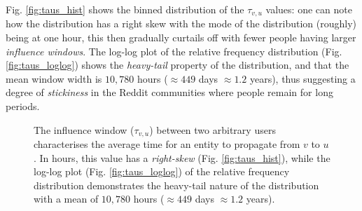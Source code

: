 \documentclass[review]{elsarticle}
\begin{document}
Fig. \ref{fig:taus_hist} shows the binned distribution of the $\tau_{v,u}$ values: one can note how the distribution has a right skew with the mode of the distribution (roughly) being at one hour, this then gradually curtails off with fewer people having larger \emph{influence windows}.
The log-log plot of the relative frequency distribution (Fig. \ref{fig:taus_loglog}) shows the \emph{heavy-tail} property of the distribution, and that the mean window width is $10,780$ hours ($\approx 449$ days $\approx 1.2$ years), thus suggesting a degree of \emph{stickiness} in the Reddit communities where people remain for long periods.


\begin{figure}[ht!]
  \begin{center}
  \end{center}    
  \caption{The influence window ($\tau_{v,u}$) between two arbitrary users characterises the average time for an entity to propagate from $v$ to $u$. In hours, this value has a \emph{right-skew} (Fig. \ref{fig:taus_hist}), while the log-log plot (Fig. \ref{fig:taus_loglog}) of the relative frequency distribution demonstrates the heavy-tail nature of the distribution with a mean of $10,780$ hours ($\approx 449$ days $\approx 1.2$ years).}
  \label{fig:taus}
\end{figure}
\end{document}
